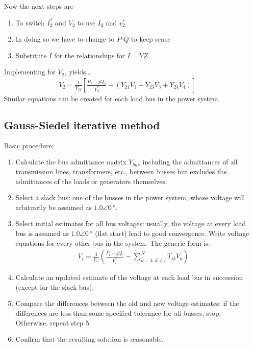 Now the next steps are
\begin{enumerate}
	\item To switch $I^*_2$ and $V_2$ to use $I_2$ and $v_2^*$
	\item In doing so we have to change to $P$-$Q$ to keep sense
	\item Substitute $I$ for the relationships for $I = YZ$
\end{enumerate}
Implementing for $V_2$, yields\dots
\begin{gather}
	V_2 = \frac{1}{Y_{22}}\left[\frac{P_2-jQ_2}{V_2^*}-\left(Y_{21}V_1+Y_{23}V_3+Y_{24}V_4\right)\right]
\end{gather}
Similar equations can be created for each load bus in the power system.
\subsection{Gauss-Siedel iterative method}
Basic procedure:
\begin{enumerate}
	\item Calculate the bus admittance matrix $Y_{bus}$ including the admittances of all transmission lines, transformers, etc., between busses but excludes the admittances of the loads or generators themselves.
	\item Select a slack bus: one of the busses in the power system, whose voltage will arbitrarily be assumed as $1.0\angle\SI{0}{\degree}$.
	\item Select initial estimates for all bus voltages: usually, the voltage at every load bus is assumed as $1.0\angle\SI{0}{\degree}$ (flat start) lead to good convergence. Write voltage equations for every other bus in the system. The generic form is:
	      \begin{gather}
		      V_i = \frac{1}{Y_{ii}}\left(\frac{P_i-jQ_i}{V_i^*}-\sum^N_{k=1,\,k\neq i}T_{ik}V_k\right)
	      \end{gather}
	\item Calculate an updated estimate of the voltage at each load bus in succession (except for the slack bus).
	\item Compare the differences between the old and new voltage estimates: if the differences are less than some specified tolerance for all busses, stop. Otherwise, repeat step 5.
	\item Confirm that the resulting solution is reasonable.
\end{enumerate}
